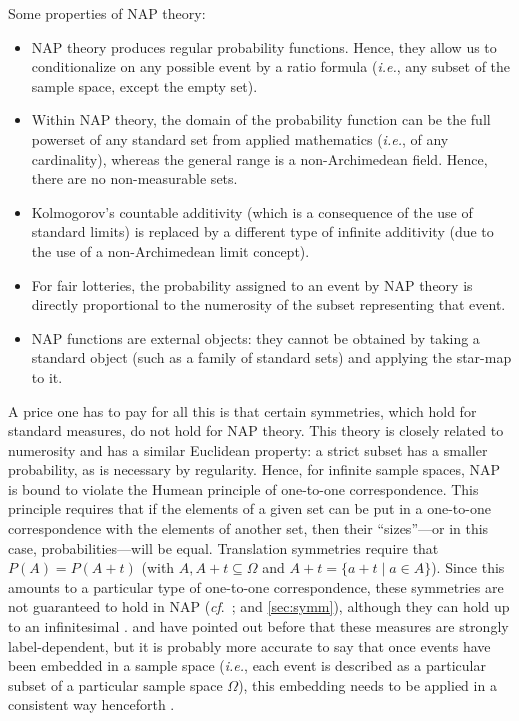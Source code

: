 Some properties of NAP theory:
\begin{itemize}
  \item NAP theory produces regular probability functions. Hence, they allow us to conditionalize on any possible event by a ratio formula (\textit{i.e.}, any subset of the sample space, except the empty set).
  \item Within NAP theory, the domain of the probability function can be the full powerset of any standard set from applied mathematics (\textit{i.e.}, of any cardinality), whereas the general range is a non-Archimedean field. Hence, there are no non-measurable sets.
  \item Kolmogorov's countable additivity (which is a consequence of the use of standard limits) is replaced by a different type of infinite additivity (due to the use of a non-Archimedean limit concept).
  \item For fair lotteries, the probability assigned to an event by NAP theory is directly proportional to the numerosity of the subset representing that event.
  \item NAP functions are external objects: they cannot be obtained by taking a standard object (such as a family of standard sets) and applying the star-map to it.
\end{itemize}

A price one has to pay for all this is that certain symmetries, which hold for standard measures, do not hold for NAP theory. This theory is closely related to numerosity and has a similar Euclidean property: a strict subset has a smaller probability, as is necessary by regularity. Hence, for infinite sample spaces, NAP is bound to violate the Humean principle of one-to-one correspondence. This principle requires that if the elements of a given set can be put in a one-to-one
correspondence with the elements of another set, then their ``sizes''---or in this case, probabilities---will be equal. Translation symmetries require that $P(A)=P(A+t)$ (with $A, A+t \subseteq \Omega$ and $A+t=\{a+t \mid a\in A\}$). Since this amounts to a particular type of one-to-one correspondence, these symmetries are not guaranteed to hold in NAP (\textit{cf}.\ \citealt{Williamson:2007,Parker:2013}; and \autoref{sec:symm}), although they can hold up to an infinitesimal \citep{BernsteinWattenberg:1969}. \citet{Bartha:2004} and \citet{Weintraub:2008} have pointed out before that these measures are strongly label-dependent, but it is probably more accurate to say that once events have been embedded in a sample space (\textit{i.e.}, each event is described as a particular subset of a particular sample space $\Omega$), this embedding needs to be applied in a consistent way henceforth \citep{Hofweber:2014,Benci_etal:2018}.

